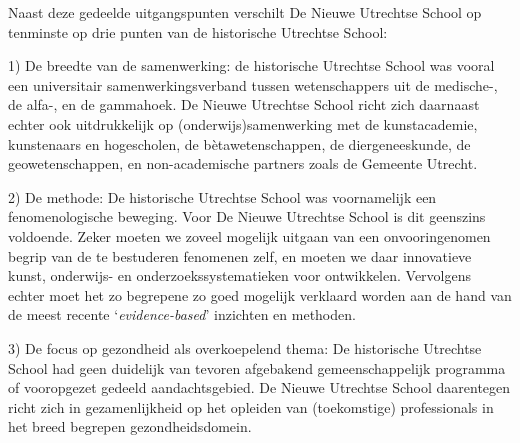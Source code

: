 \documentclass[smallauthor, chapterhaspagenum, nochapterinheader, pagenuminheader,  bigchapnum,medium2, tocpages,  garamond, titleinheader]{jote-book}
\begin{document}
	\begin{bookboxnotitle}
		Naast deze gedeelde uitgangspunten verschilt De Nieuwe Utrechtse School op tenminste op drie punten van de historische Utrechtse School:
	\end{bookboxnotitle}
	\begin{bookboxnotitle}
		1) De breedte van de samenwerking: de historische Utrechtse School was vooral een universitair samenwerkingsverband tussen wetenschappers uit de medische-, de alfa-, en de gammahoek. De Nieuwe Utrechtse School richt zich daarnaast echter ook uitdrukkelijk op (onderwijs)samenwerking met de kunstacademie, kunstenaars en hogescholen, de bètawetenschappen, de diergeneeskunde, de geowetenschappen, en non-academische partners zoals de Gemeente Utrecht.
	\end{bookboxnotitle}
	\begin{bookboxnotitle}
		2) De methode: De historische Utrechtse School was voornamelijk een fenomenologische beweging. Voor De Nieuwe Utrechtse School is dit geenszins voldoende. Zeker moeten we zoveel mogelijk uitgaan van een onvooringenomen begrip van de te bestuderen fenomenen zelf, en moeten we daar innovatieve kunst, onderwijs- en onderzoekssystematieken voor ontwikkelen. Vervolgens echter moet het zo begrepene zo goed mogelijk verklaard worden aan de hand van de meest recente ‘\emph{evidence-based}' inzichten en methoden.
	\end{bookboxnotitle}
	\begin{bookboxnotitle}
		3) De focus op gezondheid als overkoepelend thema: De historische Utrechtse School had geen duidelijk van tevoren afgebakend gemeenschappelijk programma of vooropgezet gedeeld aandachtsgebied. De Nieuwe Utrechtse School daarentegen richt zich in gezamenlijkheid op het opleiden van (toekomstige) professionals in het breed begrepen gezondheidsdomein.
	\end{bookboxnotitle}
\end{document}
